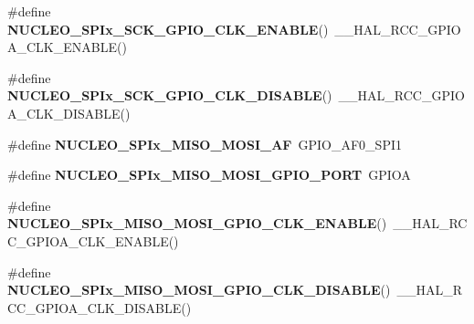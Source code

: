 \begin{DoxyCompactItemize}
\#define {\bfseries N\+U\+C\+L\+E\+O\+\_\+\+S\+P\+Ix\+\_\+\+S\+C\+K\+\_\+\+G\+P\+I\+O\+\_\+\+C\+L\+K\+\_\+\+E\+N\+A\+B\+LE}()~\+\_\+\+\_\+\+H\+A\+L\+\_\+\+R\+C\+C\+\_\+\+G\+P\+I\+O\+A\+\_\+\+C\+L\+K\+\_\+\+E\+N\+A\+B\+LE()
\item 
\mbox{\label{group___s_t_m32_f0_x_x___n_u_c_l_e_o___b_u_s_ga34c1aa4a6019af776dc9e5efde6cb27f}} 
\#define {\bfseries N\+U\+C\+L\+E\+O\+\_\+\+S\+P\+Ix\+\_\+\+S\+C\+K\+\_\+\+G\+P\+I\+O\+\_\+\+C\+L\+K\+\_\+\+D\+I\+S\+A\+B\+LE}()~\+\_\+\+\_\+\+H\+A\+L\+\_\+\+R\+C\+C\+\_\+\+G\+P\+I\+O\+A\+\_\+\+C\+L\+K\+\_\+\+D\+I\+S\+A\+B\+LE()
\item 
\mbox{\label{group___s_t_m32_f0_x_x___n_u_c_l_e_o___b_u_s_gad790e45e4ce76cb80e69a376159dfb9e}} 
\#define {\bfseries N\+U\+C\+L\+E\+O\+\_\+\+S\+P\+Ix\+\_\+\+M\+I\+S\+O\+\_\+\+M\+O\+S\+I\+\_\+\+AF}~G\+P\+I\+O\+\_\+\+A\+F0\+\_\+\+S\+P\+I1
\item 
\mbox{\label{group___s_t_m32_f0_x_x___n_u_c_l_e_o___b_u_s_ga10622c715c7e1fc0453440992d16093e}} 
\#define {\bfseries N\+U\+C\+L\+E\+O\+\_\+\+S\+P\+Ix\+\_\+\+M\+I\+S\+O\+\_\+\+M\+O\+S\+I\+\_\+\+G\+P\+I\+O\+\_\+\+P\+O\+RT}~G\+P\+I\+OA
\item 
\mbox{\label{group___s_t_m32_f0_x_x___n_u_c_l_e_o___b_u_s_ga0cbbf67d1b200682dae291919dc6ae9b}} 
\#define {\bfseries N\+U\+C\+L\+E\+O\+\_\+\+S\+P\+Ix\+\_\+\+M\+I\+S\+O\+\_\+\+M\+O\+S\+I\+\_\+\+G\+P\+I\+O\+\_\+\+C\+L\+K\+\_\+\+E\+N\+A\+B\+LE}()~\+\_\+\+\_\+\+H\+A\+L\+\_\+\+R\+C\+C\+\_\+\+G\+P\+I\+O\+A\+\_\+\+C\+L\+K\+\_\+\+E\+N\+A\+B\+LE()
\item 
\mbox{\label{group___s_t_m32_f0_x_x___n_u_c_l_e_o___b_u_s_gae2a3d5ff8a6ea531461fdd11ab674610}} 
\#define {\bfseries N\+U\+C\+L\+E\+O\+\_\+\+S\+P\+Ix\+\_\+\+M\+I\+S\+O\+\_\+\+M\+O\+S\+I\+\_\+\+G\+P\+I\+O\+\_\+\+C\+L\+K\+\_\+\+D\+I\+S\+A\+B\+LE}()~\+\_\+\+\_\+\+H\+A\+L\+\_\+\+R\+C\+C\+\_\+\+G\+P\+I\+O\+A\+\_\+\+C\+L\+K\+\_\+\+D\+I\+S\+A\+B\+LE()
\item 
\mbox{\label{group___s_t_m32_f0_x_x___n_u_c_l_e_o___b_u_s_gae68919457ce60824ce421b0f1b304a66}} 

\end{DoxyCompactItemize}
